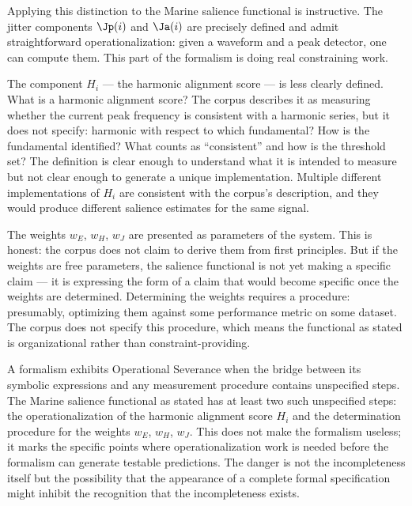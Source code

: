 Applying this distinction to the Marine salience functional
is instructive. The jitter components $\Jp(i)$ and $\Ja(i)$
are precisely defined and admit straightforward operationalization:
given a waveform and a peak detector, one can compute them.
This part of the formalism is doing real constraining work.

The component $H_i$ --- the harmonic alignment score ---
is less clearly defined. What is a harmonic alignment score?
The corpus describes it as measuring whether the current
peak frequency is consistent with a harmonic series, but
it does not specify: harmonic with respect to which
fundamental? How is the fundamental identified? What counts
as ``consistent'' and how is the threshold set? The definition
is clear enough to understand what it is intended to measure
but not clear enough to generate a unique implementation.
Multiple different implementations of $H_i$ are consistent
with the corpus's description, and they would produce
different salience estimates for the same signal.

The weights $w_E$, $w_H$, $w_J$ are presented as parameters
of the system. This is honest: the corpus does not claim
to derive them from first principles. But if the weights
are free parameters, the salience functional is not yet
making a specific claim --- it is expressing the form of
a claim that would become specific once the weights are
determined. Determining the weights requires a procedure:
presumably, optimizing them against some performance metric
on some dataset. The corpus does not specify this procedure,
which means the functional as stated is organizational rather
than constraint-providing.

\begin{dangerzone}
A formalism exhibits Operational Severance when the bridge
between its symbolic expressions and any measurement
procedure contains unspecified steps. The Marine salience
functional as stated has at least two such unspecified
steps: the operationalization of the harmonic alignment
score $H_i$ and the determination procedure for the weights
$w_E$, $w_H$, $w_J$. This does not make the formalism
useless; it marks the specific points where
operationalization work is needed before the formalism
can generate testable predictions. The danger is not
the incompleteness itself but the possibility that the
appearance of a complete formal specification might inhibit
the recognition that the incompleteness exists.
\end{dangerzone}

